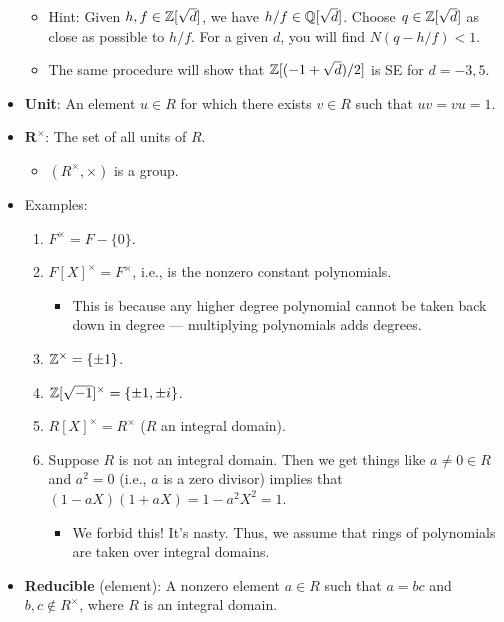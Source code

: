 \documentclass[../notes.tex]{subfiles}
\begin{document}
\begin{itemize}
    \begin{itemize}
        \item Hint: Given $h,f\in\mathbb{Z}[\sqrt{d}]$, we have $h/f\in\mathbb{Q}[\sqrt{d}]$. Choose $q\in\mathbb{Z}[\sqrt{d}]$ as close as possible to $h/f$. For a given $d$, you will find $N(q-h/f)<1$.
        \item The same procedure will show that $\mathbb{Z}[(-1+\sqrt{d})/2]$ is SE for $d=-3,5$.
    \end{itemize}
    \item \textbf{Unit}: An element $u\in R$ for which there exists $v\in R$ such that $uv=vu=1$.
    \item $\bm{R^\times}$: The set of all units of $R$.
    \begin{itemize}
        \item $(R^\times,\times)$ is a group.
    \end{itemize}
    \item Examples:
    \begin{enumerate}
        \item $F^\times=F-\{0\}$.
        \item $F[X]^\times=F^\times$, i.e., is the nonzero constant polynomials.
        \begin{itemize}
            \item This is because any higher degree polynomial cannot be taken back down in degree --- multiplying polynomials adds degrees.
        \end{itemize}
        \item $\mathbb{Z}^\times=\{\pm 1\}$.
        \item $\mathbb{Z}[\sqrt{-1}]^\times=\{\pm 1,\pm i\}$.
        \item $R[X]^\times=R^\times$ ($R$ an integral domain).
        \item Suppose $R$ is not an integral domain. Then we get things like $a\neq 0\in R$ and $a^2=0$ (i.e., $a$ is a zero divisor) implies that $(1-aX)(1+aX)=1-a^2X^2=1$.
        \begin{itemize}
            \item We forbid this! It's nasty. Thus, we assume that rings of polynomials are taken over integral domains.
        \end{itemize}
    \end{enumerate}
    \item \textbf{Reducible} (element): A nonzero element $a\in R$ such that $a=bc$ and $b,c\notin R^\times$, where $R$ is an integral domain.
    \begin{itemize}

\end{itemize}
\end{itemize}
\end{document}
